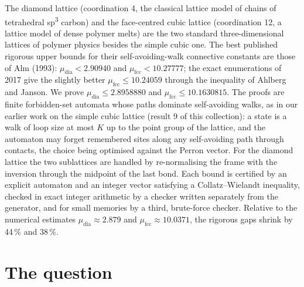 \documentclass[11pt,a4paper]{report}
\newcommand*{\fcc}{\mathrm{fcc}}
\newcommand*{\dia}{\mathrm{dia}}
\begin{document}
\makepapertitle

\begin{paperabstract}
The diamond lattice (coordination 4, the classical lattice model of chains of tetrahedral sp\textsuperscript{3}
carbon) and the face-centred cubic lattice (coordination 12, a lattice model of dense polymer melts) are the two
standard three-dimensional lattices of polymer physics besides the simple cubic one. The best published rigorous upper
bounds for their self-avoiding-walk connective constants are those of Alm (1993): \(\mu_\dia<2.90940\) and
\(\mu_\fcc<10.27777\); the exact enumerations of 2017 give the slightly better \(\mu_\fcc\le10.24059\) through the
inequality of Ahlberg and Janson. We prove \(\mu_\dia\le 2.8958880\) and \(\mu_\fcc\le 10.1630815\). The proofs are finite forbidden-set automata
whose paths dominate self-avoiding walks, as in our earlier work on the simple cubic lattice (result 9 of this collection): a state is a walk of
loop size at most \(K\) up to the point group of the lattice, and the automaton may forget remembered sites along any
self-avoiding path through contacts, the choice being optimised against the Perron vector. For the diamond lattice the
two sublattices are handled by re-normalising the frame with the inversion through the midpoint of the last bond.
Each bound is certified by an explicit automaton and an integer vector satisfying a Collatz--Wielandt inequality,
checked in exact integer arithmetic by a checker written separately from the generator, and for small memories by a
third, brute-force checker. Relative to the numerical estimates \(\mu_\dia\approx2.879\) and
\(\mu_\fcc\approx10.0371\), the rigorous gaps shrink by 44\,\% and 38\,\%.
\end{paperabstract}

\section*{The question}
\end{document}
